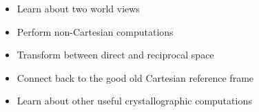 \begin{learningobjectives}
{\begin{itemize}
    \item[{\color{OCBurntOrange}\ref{\chabbr:sec:worldviews}:}] Learn about two world views
    \item[{\color{OCBurntOrange}\ref{\chabbr:sec:crystalcomputations}:}] Perform non-Cartesian computations
    \item[{\color{OCBurntOrange}\ref{\chabbr:sec:transform}:}] Transform between direct and reciprocal space
    \item[{\color{OCBurntOrange}\ref{\chabbr:sec:Cartesian}:}] Connect back to the good old Cartesian reference frame    
    \item[{\color{OCBurntOrange}\ref{\chabbr:sec:usefulcomp}:}] Learn about other useful crystallographic computations
\end{itemize}}
\end{learningobjectives}

